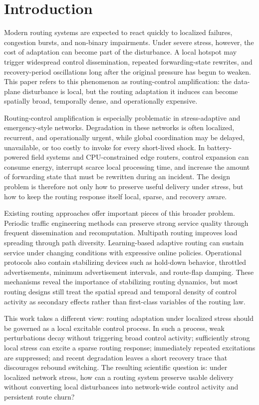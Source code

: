 \documentclass[5p,times]{elsarticle}
\begin{document}
\section{Introduction}

Modern routing systems are expected to react quickly to localized failures, congestion bursts, and non-binary impairments. Under severe stress, however, the cost of adaptation can become part of the disturbance. A local hotspot may trigger widespread control dissemination, repeated forwarding-state rewrites, and recovery-period oscillations long after the original pressure has begun to weaken. This paper refers to this phenomenon as routing-control amplification: the data-plane disturbance is local, but the routing adaptation it induces can become spatially broad, temporally dense, and operationally expensive.

Routing-control amplification is especially problematic in stress-adaptive and emergency-style networks. Degradation in these networks is often localized, recurrent, and operationally urgent, while global coordination may be delayed, unavailable, or too costly to invoke for every short-lived shock. In battery-powered field systems and CPU-constrained edge routers, control expansion can consume energy, interrupt scarce local processing time, and increase the amount of forwarding state that must be rewritten during an incident. The design problem is therefore not only how to preserve useful delivery under stress, but how to keep the routing response itself local, sparse, and recovery aware.

Existing routing approaches offer important pieces of this broader problem. Periodic traffic engineering methods can preserve strong service quality through frequent dissemination and recomputation. Multipath routing improves load spreading through path diversity. Learning-based adaptive routing can sustain service under changing conditions with expressive online policies. Operational protocols also contain stabilizing devices such as hold-down behavior, throttled advertisements, minimum advertisement intervals, and route-flap damping. These mechanisms reveal the importance of stabilizing routing dynamics, but most routing designs still treat the spatial spread and temporal density of control activity as secondary effects rather than first-class variables of the routing law.

This work takes a different view: routing adaptation under localized stress should be governed as a local excitable control process. In such a process, weak perturbations decay without triggering broad control activity; sufficiently strong local stress can excite a sparse routing response; immediately repeated excitations are suppressed; and recent degradation leaves a short recovery trace that discourages rebound switching. The resulting scientific question is: under localized network stress, how can a routing system preserve usable delivery without converting local disturbances into network-wide control activity and persistent route churn?
\end{document}
